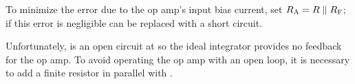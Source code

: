 To minimize the error due to the op amp's input bias current, set \(\R[A] = R \parallel \R[F]\);
if this error is negligible \R[A] can be replaced with a short circuit.

Unfortunately, \C is an open circuit at \DC so the ideal integrator provides no \DC feedback for the op amp.
To avoid operating the op amp with an open loop, it is necessary to add a finite resistor \R[F] in parallel with \C.


